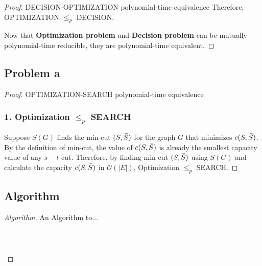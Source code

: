 \documentclass[openany]{article}
\begin{document}
\begin{proof}{}{DECISION-OPTIMIZATION polynomial-time equivalence}
Therefore,   OPTIMIZATION $\leq_p$ DECISION.

Now that \textbf{Optimization problem} and \textbf{Decision problem} can be mutually polynomial-time reducible, they are polynomial-time equivalent.
\end{proof}

\subsection*{Problem a}
\begin{proof}{}{OPTIMIZATION-SEARCH polynomial-time equivalence}
    
\subsubsection*{1. Optimization $\leq_p$ SEARCH}
Suppose $S(G)$ finds the min-cut $(S,\Bar{S})$ for the graph $G$ that minimizes $c(S,\Bar{S})$. By the definition of min-cut, the value of $c(S,\Bar{S})$ is already the smallest capacity value of any $s-t$ cut. Therefore, by finding min-cut $(S,\Bar{S})$ using $S(G)$ and calculate the capacity $c(S,\Bar{S})$ in $\mathcal{O}(|E|)$,  Optimization $\leq_p$ SEARCH.

\end{proof}

    
\subsection*{Algorithm}
\begin{proof}[Algorithm]{}
		\renewcommand{\qedsymbol}{}
		An Algorithm to...
		\begin{lstlisting}[basicstyle=\fontsize{8}{9}\selectfont\ttfamily]

        
		\end{lstlisting} 
\end{proof}
\end{document}

